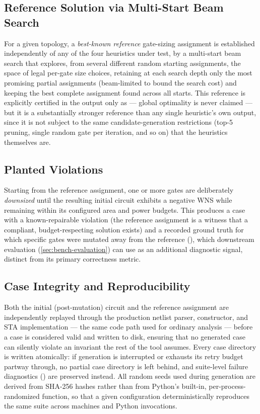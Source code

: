\subsection{Reference Solution via Multi-Start Beam Search}
\label{sec:bench-reference}

For a given topology, a \emph{best-known reference} gate-sizing assignment
is established independently of any of the four heuristics under test, by
a multi-start beam search that explores, from several different random
starting assignments, the space of legal per-gate size choices, retaining
at each search depth only the most promising partial assignments
(beam-limited to bound the search cost) and keeping the best complete
assignment found across all starts. This reference is explicitly certified
in the output only as  --- global
optimality is never claimed --- but it is a substantially stronger
reference than any single heuristic's own output, since it is not subject
to the same candidate-generation restrictions (top-5 pruning, single random
gate per iteration, and so on) that the heuristics themselves are.

\subsection{Planted Violations}
\label{sec:bench-planted}

Starting from the reference assignment, one or more gates are deliberately
\emph{downsized} until the resulting initial circuit exhibits a negative
WNS while remaining within its configured area and power budgets. This
produces a case with a known-repairable violation (the reference assignment
is a witness that a compliant, budget-respecting solution exists) and a
recorded ground truth for which specific gates were mutated away from the
reference (), which downstream evaluation
(\cref{sec:bench-evaluation}) can use as an additional diagnostic signal,
distinct from its primary correctness metric.

\subsection{Case Integrity and Reproducibility}
\label{sec:bench-integrity}

Both the initial (post-mutation) circuit and the reference assignment are
independently replayed through the production netlist parser, 
constructor, and STA implementation --- the same code path used for
ordinary analysis --- before a case is considered valid and written to
disk, ensuring that no generated case can silently violate an invariant the
rest of the tool assumes. Every case directory is written atomically: if
generation is interrupted or exhausts its retry budget partway through, no
partial case directory is left behind, and suite-level failure diagnostics
() are preserved instead. All random seeds
used during generation are derived from SHA-256 hashes rather than from
Python's built-in, per-process-randomized  function, so that a
given configuration deterministically reproduces the same suite across
machines and Python invocations.

